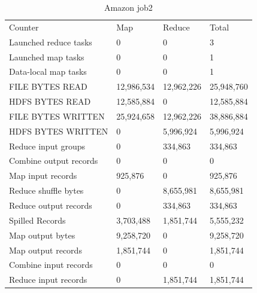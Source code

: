 \documentclass[paper=a4, fontsize=11pt]{scrartcl}	%
\numberwithin{equation}{section}															%
\numberwithin{figure}{section}																%
\numberwithin{table}{section}																%
\begin{document}
\begin{table}[]
	\centering
	\caption{Amazon job2}
	\label{my-label}
	\begin{tabular}{llll}
		Counter	&Map	&Reduce	&Total\\
		Launched reduce tasks	&0	&0	&3\\
		Launched map tasks	    &0	&0	&1\\
		Data-local map tasks	&0	&0	&1\\
		FILE BYTES READ	        &12,986,534	&12,962,226	&25,948,760\\
		HDFS BYTES READ	        &12,585,884	&0	&12,585,884\\
		FILE BYTES WRITTEN	    &25,924,658	&12,962,226	&38,886,884\\
		HDFS BYTES WRITTEN	    &0	&5,996,924	&5,996,924\\
		Reduce input groups	    &0	&334,863	&334,863\\
		Combine output records	&0	&0	&0\\
		Map input records	    &925,876	&0	&925,876\\
		Reduce shuffle bytes	&0	&8,655,981	&8,655,981\\
		Reduce output records	&0	&334,863	&334,863\\
		Spilled Records	        &3,703,488&	1,851,744&	5,555,232\\
		Map output bytes	    &9,258,720&	0	&9,258,720\\
		Map output records	    &1,851,744&	0	&1,851,744\\
		Combine input records	&0	&0&	0\\
		Reduce input records	&0	&1,851,744	&1,851,744\\
		
	\end{tabular}
\end{table}
\end{document}
